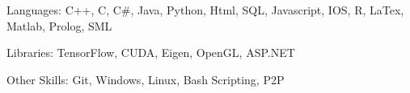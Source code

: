

\begin{cvskills}

  \cvskill
    {Languages:} %
    {C++, C, C\#, Java, Python, Html, SQL, Javascript, IOS, R, LaTex, Matlab, Prolog, SML} %

  \cvskill
    {Libraries:} %
    {TensorFlow, CUDA, Eigen, OpenGL, ASP.NET} %

  \cvskill
    {Other Skills:} %
    {Git, Windows, Linux, Bash Scripting, P2P} %

\end{cvskills}
